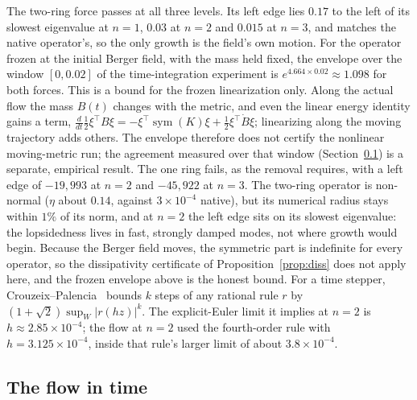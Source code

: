 \documentclass[11pt]{article}
\theoremstyle{definition}
\theoremstyle{remark}
\begin{document}
The two-ring force passes at all three levels. Its left edge lies $0.17$ to the left of its slowest
eigenvalue at $n=1$, $0.03$ at $n=2$ and $0.015$ at $n=3$, and matches the native operator's, so the only growth is the field's own motion.
For the operator frozen at the initial Berger field, with the mass held fixed, the envelope over the
window $[0,0.02]$ of the time-integration experiment is $e^{4.664\times0.02}\approx1.098$ for both
forces. This is a bound for the frozen linearization only. Along the actual flow the mass $B(t)$
changes with the metric, and even the linear energy identity gains a term,
$\tfrac{d}{dt}\tfrac12\xi^\top B\xi=-\xi^\top\operatorname{sym}(K)\xi+\tfrac12\xi^\top\dot B\xi$;
linearizing along the moving trajectory adds others. The envelope therefore does not certify the
nonlinear moving-metric run; the agreement measured over that window (Section~\ref{sec:su2flow}) is a
separate, empirical result. The one ring fails, as the removal
requires, with a left edge of $-19{,}993$ at $n=2$ and $-45{,}922$ at $n=3$. The two-ring operator is non-normal
($\eta$ about $0.14$, against $3\times10^{-4}$ native), but its numerical radius stays within
$1\%$ of its norm, and at $n=2$ the left edge sits on its slowest eigenvalue: the lopsidedness lives in
fast, strongly damped modes, not where growth would begin. Because the Berger field moves,
the symmetric part is indefinite for every operator, so the dissipativity certificate of
Proposition~\ref{prop:diss} does not apply here, and the frozen envelope above is the honest bound.
For a time stepper, Crouzeix--Palencia~\cite{cp} bounds $k$ steps of any rational rule $r$ by
$(1+\sqrt2)\sup_{W}|r(hz)|^k$. The explicit-Euler limit it implies at $n=2$ is
$h\approx2.85\times10^{-4}$; the flow at $n=2$ used the fourth-order rule with
$h=3.125\times10^{-4}$, inside that rule's larger limit of about $3.8\times10^{-4}$.

\subsection{The flow in time}\label{sec:su2flow}
\end{document}
